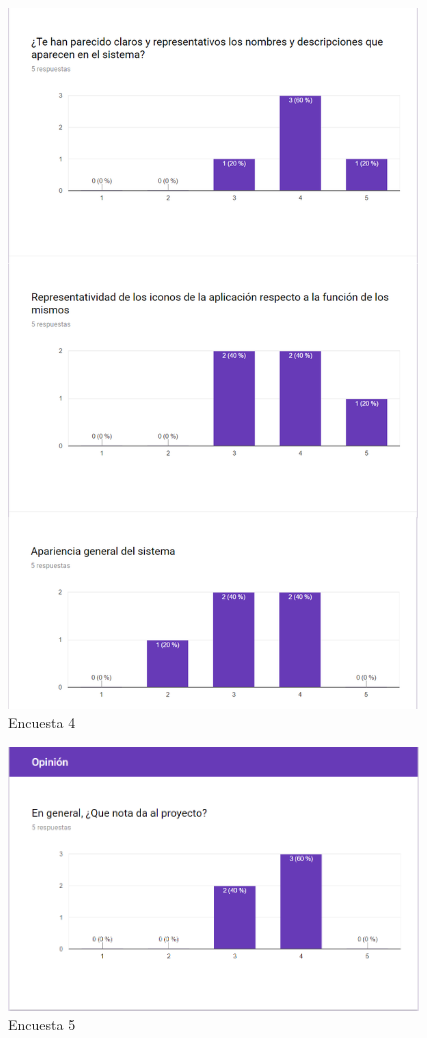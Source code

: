 \documentclass{pclass}
\begin{document}
\begin{figure}[H]
	\centering
	\includegraphics[width=0.97\textwidth]{img/cuarta}
	\caption{Encuesta 4}
	\label{fig:cuartaEncuesta}
\end{figure}

\begin{figure}[H]
	\centering
	\includegraphics[width=0.97\textwidth]{img/quinta}
	\caption{Encuesta 5}
	\label{fig:quintaEncuesta}
\end{figure}
\end{document}

